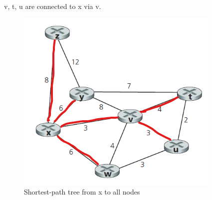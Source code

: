 \documentclass[11pt]{article}
\begin{document}
{{\begin{center}
        v, t, u are connected to x via v.
    \end{center}
    \begin{figure}[ht]
        \centering
        \includegraphics[width=0.5\linewidth]{shortest-path-tree.png}
        \caption{Shortest-path tree from x to all nodes}
    \end{figure}
}}
\end{document}
